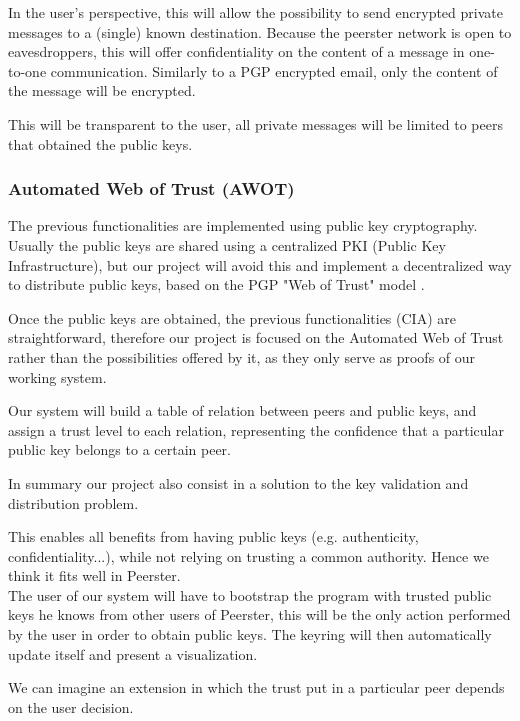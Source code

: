 \documentclass[]{article}
\begin{document}
In the user's perspective, this will allow the possibility to send encrypted private messages to a (single) known destination. Because the peerster network is open to eavesdroppers, this will offer confidentiality on the content of a message in one-to-one communication. Similarly to a PGP encrypted email, only the content of the message will be encrypted.

This will be transparent to the user, all private messages will be limited to peers that obtained the public keys.

\subsubsection{Automated Web of Trust (AWOT)} 
The previous functionalities are implemented using public key cryptography. Usually the public keys are shared using a centralized PKI (Public Key Infrastructure), but our project will avoid this and implement a decentralized way to distribute public keys, based on the PGP "Web of Trust" model \cite{abdul1997pgp}.

Once the public keys are obtained, the previous functionalities (CIA) are straightforward, therefore our project is focused on the Automated Web of Trust rather than the possibilities offered by it, as they only serve as proofs of our working system.

Our system will build a table of relation between peers and public keys, and assign a trust level to each relation, representing the confidence that a particular public key belongs to a certain peer.

In summary our project also consist in a solution to the key validation and distribution problem. 

This enables all benefits from having public keys (e.g. authenticity, confidentiality...), while not relying on trusting a common authority. Hence we think it fits well in Peerster. \\

The user of our system will have to bootstrap the program with trusted public keys he knows from other users of Peerster, this will be the only action performed by the user in order to obtain public keys. The keyring will then automatically update itself and present a visualization.

We can imagine an extension in which the trust put in a particular peer depends on the user decision.
\end{document}
